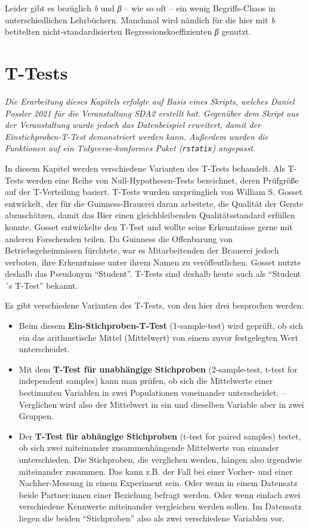 \documentclass[
]{book}
\begin{document}
Leider gibt es bezüglich \emph{b} und \emph{β} -- wie so oft -- ein wenig Begriffs-Chaos in unterschiedlichen Lehrbüchern. Manchmal wird nämlich für die hier mit \emph{b} betitelten nicht-standardisierten Regressionskoeffizienten \emph{β} genutzt.

\hypertarget{t-tests}{%
\chapter{T-Tests}\label{t-tests}}

\emph{Die Erarbeitung dieses Kapitels erfolgte auf Basis eines Skripts, welches Daniel Possler 2021 für die Veranstaltung SDA2 erstellt hat. Gegenüber dem Skript aus der Veranstaltung wurde jedoch das Datenbeispiel erweitert, damit der Einstichproben-T-Test demonstriert werden kann. Außerdem wurden die Funktionen auf ein Tidyverse-konformes Paket (\texttt{rstatix}) angepasst.}

In diesem Kapitel werden verschiedene Varianten des T-Tests behandelt.
Als T-Tests werden eine Reihe von Null-Hypothesen-Tests bezeichnet, deren Prüfgröße auf der T-Verteilung basiert.
T-Tests wurden ursprünglich von William S. Gosset entwickelt, der für die Guinness-Brauerei daran arbeitete, die Qualität der Gerste abzuschätzen, damit das Bier einen gleichbleibenden Qualitätsstandard erfüllen konnte.
Gosset entwickelte den T-Test und wollte seine Erkenntnisse gerne mit anderen Forschenden teilen.
Da Guinness die Offenbarung von Betriebsgeheimnissen fürchtete, war es Mitarbeitenden der Brauerei jedoch verboten, ihre Erkenntnisse unter ihrem Namen zu veröffentlichen.
Gosset nutzte deshalb das Pseudonym ``Student''.
T-Tests sind deshalb heute auch als ``Student´s T-Test'' bekannt.

Es gibt verschiedene Varianten des T-Tests, von den hier drei besprochen werden:

\begin{itemize}
\item
  Beim diesem \textbf{Ein-Stichproben-T-Test} (1-sample-test) wird geprüft, ob sich ein das arithmetische Mittel (Mittelwert) von einem zuvor festgelegten Wert unterscheidet.
\item
  Mit dem \textbf{T-Test für unabhängige Stichproben} (2-sample-test, t-test for independent samples) kann man prüfen, ob sich die Mittelwerte einer bestimmten Variablen in zwei Populationen voneinander unterscheidet. -- Verglichen wird also der Mittelwert in ein und dieselben Variable aber in zwei Gruppen.
\item
  Der \textbf{T-Test für abhängige Stichproben} (t-test for paired samples) testet, ob sich zwei miteinander zusammenhängende Mittelwerte von einander unterschieden. Die Stichproben, die verglichen werden, hängen also irgendwie miteinander zusammen. Das kann z.B. der Fall bei einer Vorher- und einer Nachher-Messung in einem Experiment sein. Oder wenn in einem Datensatz beide Partner:innen einer Beziehung befragt werden. Oder wenn einfach zwei verschiedene Kennwerte miteinander vergleichen werden sollen. Im Datensatz liegen die beiden ``Stichproben'' also als zwei verschiedene Variablen vor.
\end{itemize}
\end{document}
